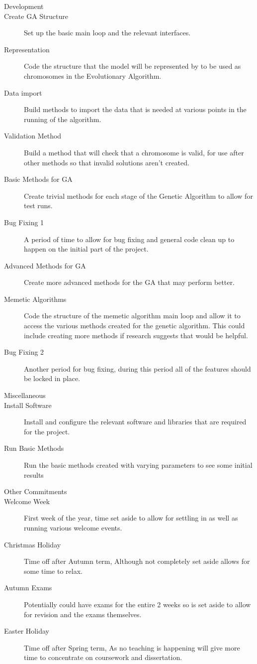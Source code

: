 \documentclass[a4paper]{article}
\begin{document}
\begin{description}
\item [\large{Development}]
\item [Create GA Structure] Set up the basic main loop and the relevant interfaces.
\item [Representation] Code the structure that the model will be represented by to be used as chromosomes in the Evolutionary Algorithm.
\item [Data import] Build methods to import the data that is needed at various points in the running of the algorithm.
\item [Validation Method] Build a method that will check that a chromosome is valid, for use after other methods so that invalid solutions aren't created.
\item [Basic Methods for GA] Create trivial methods for each stage of the Genetic Algorithm to allow for test runs.
\item [Bug Fixing 1] A period of time to allow for bug fixing and general code clean up to happen on the initial part of the project.
\item [Advanced Methods for GA] Create more advanced methods for the GA that may perform better.
\item [Memetic Algorithms] Code the structure of the memetic algorithm main loop and allow it to access the various methods created for the genetic algorithm. This could include creating more methods if research suggests that would be helpful.
\item [Bug Fixing 2] Another period for bug fixing, during this period all of the features should be locked in place.

\item [\large{Miscellaneous}]
\item [Install Software] Install and configure the relevant software and libraries that are required for the project.
\item [Run Basic Methods] Run the basic methods created with varying parameters to see some initial results

\item [\large{Other Commitments}]
\item [Welcome Week] First week of the year, time set aside to allow for settling in as well as running various welcome events.
\item [Christmas Holiday] Time off after Autumn term, Although not completely set aside allows for some time to relax.
\item [Autumn Exams] Potentially could have exams for the entire 2 weeks so is set aside to allow for revision and the exams themselves.
\item [Easter Holiday] Time off after Spring term, As no teaching is happening will give more time to concentrate on coursework and dissertation.
\end{description}
\end{document}
